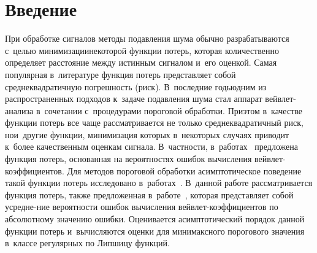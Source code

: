 




\thispagestyle{headings}

\begin{multicols}{2}

\label{st\stat}


\section{Введение}

При обработке сигналов методы подавления шума обычно разрабатываются 
с~\mbox{целью} минимизации\linebreak некоторой функции потерь, которая ко\-ли\-чест\-венно определяет 
расстояние между истинным сиг\-налом и~его оценкой. Самая популярная в~литературе 
функция потерь представляет собой сред\-не\-квад\-ра\-тич\-ную погрешность (риск). 
В~последние годы\linebreak одним из распространенных подходов к~задаче подавления шума стал 
аппарат вейв\-лет-ана\-ли\-за в~сочетании с~процедурами пороговой обработки.
 При\linebreak этом в~качестве функции потерь все чаще рас\-смат\-ри\-ва\-ет\-ся не только среднеквадратичный 
 риск, но\linebreak и~другие функции, минимизация которых в~некоторых случаях приводит к~более 
 качественным оценкам сигнала. В~част\-ности, в~работах~\cite{SMS14, SMS20}\linebreak 
 предложена функция потерь, основанная на вероятностях ошибок вычисления вейв\-лет-ко\-эф\-фи\-ци\-ен\-тов. 
 Для методов пороговой обработки асимп\-то\-ти\-че\-ское поведение такой функции потерь \mbox{исследовано} 
 в~работах~\cite{KS16-1, KS16-2}. В~данной работе рас\-смат\-ри\-ва\-ет\-ся функция потерь, также предложенная 
 в~работе~\cite{SMS20}, которая пред\-став\-ля\-ет собой усредне-\linebreak ние ве\-ро\-ят\-ности ошибок вычисления 
 вейв\-лет-ко\-эф\-фи\-ци\-ен\-тов по абсолютному значению ошиб\-ки. %
  Оценивается асимптотический порядок 
 данной функции потерь и~вычисляются оценки для минимаксного порогового значения в~классе регулярных 
 по Липшицу функций.
 
 \vspace*{-6pt}


\end{multicols}
